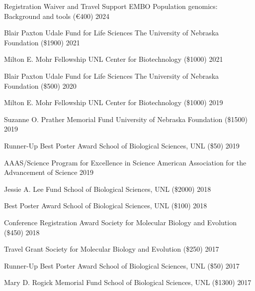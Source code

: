 
\begin{cvhonors}

  \cvhonor
    {Registration Waiver and Travel Support }
    {EMBO Population genomics: Background and tools (€400)}
    {2024}

  \cvhonor
    {Blair Paxton Udale Fund for Life Sciences}
    {The University of Nebraska Foundation (\$1900)}
    {2021}

  \cvhonor
    {Milton E. Mohr Fellowship}
    {UNL Center for Biotechnology (\$1000)}
    {2021}

  \cvhonor
    {Blair Paxton Udale Fund for Life Sciences}
    {The University of Nebraska Foundation (\$500)}
    {2020}

  \cvhonor
    {Milton E. Mohr Fellowship}
    {UNL Center for Biotechnology (\$1000)}
    {2019}

  \cvhonor
    {Suzanne O. Prather Memorial Fund}
    {University of Nebraska Foundation (\$1500)}
    {2019}

  \cvhonor
    {Runner-Up Best Poster Award}
    {School of Biological Sciences, UNL (\$50)}
    {2019}

  \cvhonor
    {AAAS/Science Program for Excellence in Science}
    {American Association for the Advancement of Science}
    {2019}

  \cvhonor
    {Jessie A. Lee Fund}
    {School of Biological Sciences, UNL (\$2000)}
    {2018} %

  \cvhonor
    {Best Poster Award}
    {School of Biological Sciences, UNL (\$100)}
    {2018}

  \cvhonor
    {Conference Registration Award}
    {Society for Molecular Biology and Evolution (\$450)}
    {2018}

  \cvhonor
    {Travel Grant}
    {Society for Molecular Biology and Evolution (\$250)}
    {2017}

  \cvhonor
    {Runner-Up Best Poster Award}
    {School of Biological Sciences, UNL (\$50)}
    {2017}

  \cvhonor
    {Mary D. Rogick Memorial Fund}
    {School of Biological Sciences, UNL (\$1300)}
    {2017}


\end{cvhonors}
